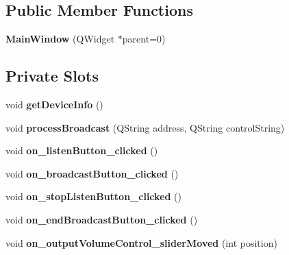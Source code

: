 \subsection*{Public Member Functions}
\begin{DoxyCompactItemize}
\item 
\hypertarget{class_main_window_a8b244be8b7b7db1b08de2a2acb9409db}{{\bfseries Main\+Window} (Q\+Widget $\ast$parent=0)}\label{class_main_window_a8b244be8b7b7db1b08de2a2acb9409db}

\end{DoxyCompactItemize}
\subsection*{Private Slots}
\begin{DoxyCompactItemize}
\item 
\hypertarget{class_main_window_afd714419be50b54076e7defa280ce0e3}{void {\bfseries get\+Device\+Info} ()}\label{class_main_window_afd714419be50b54076e7defa280ce0e3}

\item 
\hypertarget{class_main_window_a08231d6226a89db2eba0ebd94634a0c8}{void {\bfseries process\+Broadcast} (Q\+String address, Q\+String control\+String)}\label{class_main_window_a08231d6226a89db2eba0ebd94634a0c8}

\item 
\hypertarget{class_main_window_abf5188451c7c8934d2b083cc0cee6c89}{void {\bfseries on\+\_\+listen\+Button\+\_\+clicked} ()}\label{class_main_window_abf5188451c7c8934d2b083cc0cee6c89}

\item 
\hypertarget{class_main_window_a9fcfca6d7ffa439664532bfaea187614}{void {\bfseries on\+\_\+broadcast\+Button\+\_\+clicked} ()}\label{class_main_window_a9fcfca6d7ffa439664532bfaea187614}

\item 
\hypertarget{class_main_window_ac6fe47c1da6097f1e82f95a62df80ce4}{void {\bfseries on\+\_\+stop\+Listen\+Button\+\_\+clicked} ()}\label{class_main_window_ac6fe47c1da6097f1e82f95a62df80ce4}

\item 
\hypertarget{class_main_window_a9789c66a7bebb0e87ee9bac0f1d11b18}{void {\bfseries on\+\_\+end\+Broadcast\+Button\+\_\+clicked} ()}\label{class_main_window_a9789c66a7bebb0e87ee9bac0f1d11b18}

\item 
\hypertarget{class_main_window_abe3368d7caf1c748a2d76605ec2f054d}{void {\bfseries on\+\_\+output\+Volume\+Control\+\_\+slider\+Moved} (int position)}\label{class_main_window_abe3368d7caf1c748a2d76605ec2f054d}


\end{DoxyCompactItemize}
